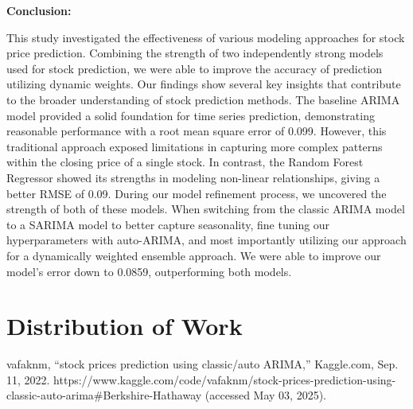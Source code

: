 \documentclass[conference]{IEEEtran}
\begin{document}
\textbf{Conclusion:}

This study investigated the effectiveness of various modeling approaches for stock price prediction. Combining the strength of two independently strong models used for stock prediction, we were able to improve the accuracy of prediction utilizing dynamic weights. Our findings show several key insights that contribute to the broader understanding of stock prediction methods. 
The baseline ARIMA model provided a solid foundation for time series prediction, demonstrating reasonable performance with a root mean square error of 0.099. However, this traditional approach exposed limitations in capturing more complex patterns within the closing price of a single stock. In contrast, the Random Forest Regressor showed its strengths in modeling non-linear relationships, giving a better RMSE of 0.09. 
During our model refinement process, we uncovered the strength of both of these models. When switching from the classic ARIMA model to a SARIMA model to better capture seasonality, fine tuning our hyperparameters with auto-ARIMA, and most importantly utilizing our approach for a dynamically weighted ensemble approach. We were able to improve our model’s error down to 0.0859, outperforming both models.

\section{Distribution of Work}

\begin{thebibliography}{00}
 vafaknm, “stock prices prediction using classic/auto ARIMA,” Kaggle.com, Sep. 11, 2022. https://www.kaggle.com/code/vafaknm/stock-prices-prediction-using-classic-auto-arima\#Berkshire-Hathaway (accessed May 03, 2025).
\end{thebibliography}
\end{document}
